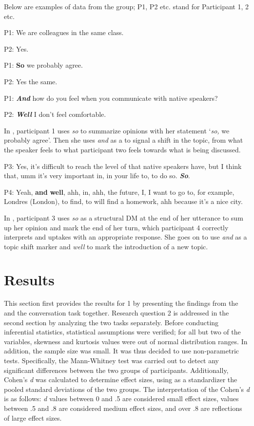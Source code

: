 \documentclass[output=paper]{langsci/langscibook}
\begin{document}
Below are examples of data from the  group; P1, P2 etc. stand for Participant 1, 2 etc.  

\ea\label{ex:ament:3} 
P1:  We are colleagues in the same class.

P2:  Yes.

P1:  \textbf{So} we probably agree.

P2:  Yes the same.

P1:  \textbf{\textit{And}} how do you feel when you communicate with native  speakers?

P2:  \textbf{\textit{Well}} I don’t feel comfortable.  
\z

In , participant 1 uses \textit{so} to summarize opinions with her statement ‘\textit{so,} we probably agree’. Then she uses \textit{and} as a  to signal a shift in the topic, from what the speaker feels to what participant two feels towards what is being discussed.  


\ea\label{ex:ament:4} 
P3:  Yes, it’s difficult to reach the level of  that native speakers have, but I think that, umm it’s very important in, in your life to, to do so. \textbf{\textit{So}}. 
 
P4:  Yeah, \textbf{and} \textbf{well}, ahh, in, ahh, the future, I, I want to go to, for example, Londres (London), to find, to will find a homework, ahh because it’s a nice city. 
\z

In , participant 3 uses \textit{so} as a structural DM at the end of her utterance to sum up her opinion and mark the end of her turn, which participant 4 correctly interprets and uptakes with an appropriate response. She goes on to use \textit{and} as a topic shift marker and \textit{well} to mark the introduction of a new topic.


\section{Results}

This section first provides the results for  1 by presenting the findings from the  and the conversation task together. Research question 2 is addressed in the second section by analyzing the two tasks separately. Before conducting inferential statistics, statistical assumptions were verified; for all but two of the variables, skewness and kurtosis values were out of normal distribution ranges. In addition, the sample size was small. It was thus decided to use non-parametric tests. Specifically, the Mann-Whitney test was carried out to detect any significant differences between the two groups of participants. Additionally, Cohen’s \textit{d} was calculated to determine effect sizes, using as a standardizer the pooled standard deviations of the two groups. The interpretation of the Cohen’s \textit{d} is as follows: \textit{d} values between 0 and .5 are considered small effect sizes, values between .5 and .8 are considered medium effect sizes, and over .8 are reflections of large effect sizes.
\end{document}
